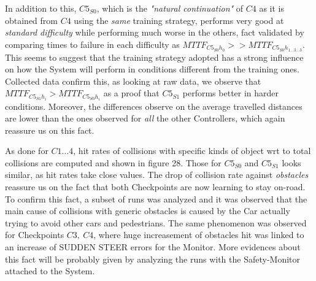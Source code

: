In addition to this, $C5_{S0}$, which is the \textsl{"natural continuation"} of $C4$ as it is obtained from $C4$ using the \textsl{same} training strategy, performs very good at \textsl{standard difficulty} while performing much worse in the others, fact validated by comparing times to failure in each difficulty as $MTTF_{C5_{S0}h_{0}} >> MTTF_{C5_{S0}h_{1\dots 3\dots 3}}$.
This seems to suggest that the training strategy adopted has a strong influence on how the System will perform in conditions different from the training ones. Collected data confirm this, as looking at raw data, we observe that $MTTF_{C5_{S1}h_{i}} > MTTF_{C5_{S0}h_{i}}$ as a proof that $C5_{S1}$ performs better in harder conditions. Moreover, the differences observe on the average travelled distances are lower than the ones observed for \textsl{all} the other Controllers, which again reassure us on this fact.\newline

As done for $C1\dots 4$, hit rates of collisions with specific kinds of object wrt to total collisions are computed and shown in figure 28. Those for $C5_{S0}$ and $C5_{S1}$ looks similar, as hit rates take close values. The drop of collision rate against \textsl{obstacles} reassure us on the fact that both Checkpoints are now learning to stay on-road. To confirm this fact, a subset of runs was analyzed and it was observed that the main cause of collisions with generic obstacles is caused by the Car actually trying to avoid other cars and pedestrians. The same phenomenon was observed for Checkpoints $C3,\: C4$, where huge increasement of obstacles hit was linked to an increase of SUDDEN STEER errors for the Monitor.
More evidences about this fact will be probably given by analyzing the runs with the Safety-Monitor attached to the System.


